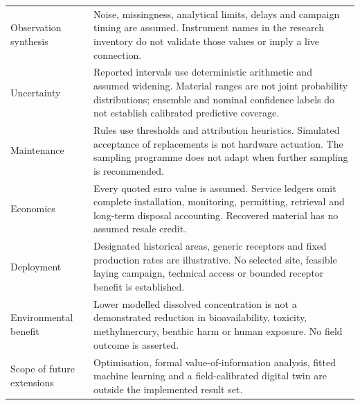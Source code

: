 \begin{longtable}{p{.24\linewidth}p{.64\linewidth}}
Observation synthesis & Noise, missingness, analytical limits, delays and campaign timing are assumed. Instrument names in the research inventory do not validate those values or imply a live connection.\\
Uncertainty & Reported intervals use deterministic arithmetic and assumed widening. Material ranges are not joint probability distributions; ensemble and nominal confidence labels do not establish calibrated predictive coverage.\\
Maintenance & Rules use thresholds and attribution heuristics. Simulated acceptance of replacements is not hardware actuation. The sampling programme does not adapt when further sampling is recommended.\\
Economics & Every quoted euro value is assumed. Service ledgers omit complete installation, monitoring, permitting, retrieval and long-term disposal accounting. Recovered material has no assumed resale credit.\\
Deployment & Designated historical areas, generic receptors and fixed production rates are illustrative. No selected site, feasible laying campaign, technical access or bounded receptor benefit is established.\\
Environmental benefit & Lower modelled dissolved concentration is not a demonstrated reduction in bioavailability, toxicity, methylmercury, benthic harm or human exposure. No field outcome is asserted.\\
Scope of future extensions & Optimisation, formal value-of-information analysis, fitted machine learning and a field-calibrated digital twin are outside the implemented result set.\\
\bottomrule
\end{longtable}

